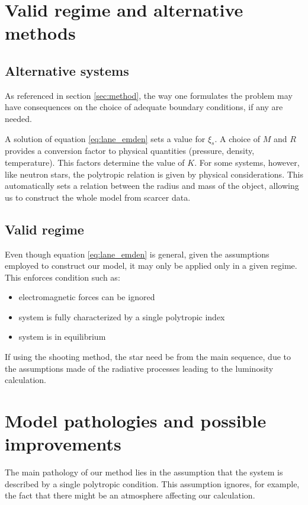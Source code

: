 \documentclass{aa}
\begin{document}
\section{Valid regime and alternative methods}
\label{sec:alternative_methods}

\subsection{Alternative systems}

As referenced in section \ref{sec:method}, the way one formulates the problem
may have consequences on the choice of adequate boundary conditions, if any are needed.

A solution of equation \ref{eq:lane_emden} sets a value for $\xi_s$. A choice of
$M$ and $R$ provides a conversion factor to physical quantities (pressure,
density, temperature). This factors determine the value of $K$. For some
systems, however, like neutron stars, the polytropic relation is given by
physical considerations. This automatically sets a relation between the radius
and mass of the object, allowing us to construct the whole model from scarcer
data.

\subsection{Valid regime}
\label{sec:regime}

Even though equation \ref{eq:lane_emden} is general, given the assumptions
employed to construct our model, it may only be applied only in a given regime.
This enforces condition such as:
\begin{itemize}
\item electromagnetic forces can be ignored
\item system is fully characterized by a single polytropic index
\item system is in equilibrium
\end{itemize}
If using the shooting method, the star need be from the main
sequence, due to the assumptions made of the radiative processes leading to
the luminosity calculation.

\section{Model pathologies and possible improvements}
\label{sec:improvs}

The main pathology of our method lies in the assumption that the system is
described by a single polytropic condition. This assumption ignores, for
example, the fact that there might be an atmosphere affecting our calculation.
\end{document}
